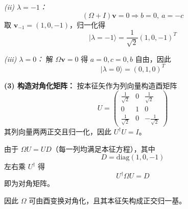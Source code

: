 \begin{solution}[考虑矩阵的本征值与对角化]
\emph{(ii) $\lambda=-1$：}
\[
(\Omega+I)\mathbf{v}=0 \Rightarrow b=0,\ a=-c
\]
取 $\mathbf{v}_{-1}=(1,0,-1)$，归一化得
\[
|\lambda=-1\rangle=\frac{1}{\sqrt{2}}(1,0,-1)^T
\]

\emph{(iii) $\lambda=0$：}
解 $\Omega \mathbf{v}=0$ 得 $a=0,c=0,b$ 自由，因此
\[
|\lambda=0\rangle=(0,1,0)^T
\]

\vspace{0.5em}
\textbf{(3) 构造对角化矩阵：}
按本征矢作为列向量构造酉矩阵
\[
U=\begin{pmatrix}
\frac{1}{\sqrt{2}} & 0 & \frac{1}{\sqrt{2}}\\
0 & 1 & 0\\
\frac{1}{\sqrt{2}} & 0 & -\frac{1}{\sqrt{2}}
\end{pmatrix}
\]
其列向量两两正交且归一化，因此 $U^\dagger U=I$。

由于 $\Omega U = U D$（每一列均满足本征方程），其中
\[
D=\mathrm{diag}(1,0,-1)
\]
左右乘 $U^\dagger$ 得
\[
U^\dagger \Omega U = D
\]
即为对角矩阵。

因此 $\Omega$ 可由酉变换对角化，且其本征矢构成正交归一基。
\end{solution}


